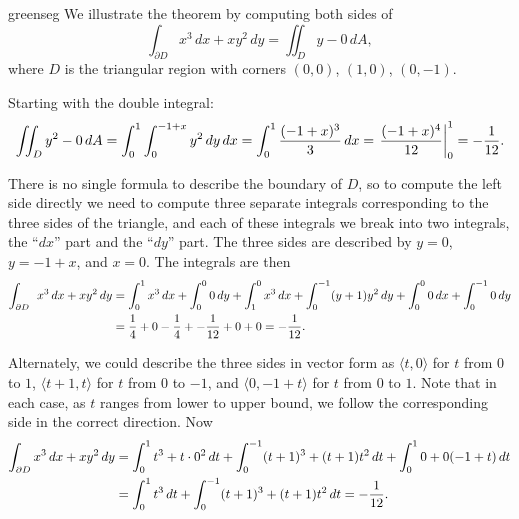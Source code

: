 \begin{example}{}{greenseg}
We illustrate the theorem by computing both sides of
$$\int_{\partial D} x^3\,dx + xy^2\,dy=\iint_D y-0\,dA,$$
where $D$ is the triangular region with corners $(0,0)$, $(1,0)$,
$(0,-1)$.
\end{example}
\begin{solution}
Starting with the double integral:
$$\iint_D y^2-0\,dA=\int_0^1\int_0^{-1+x} y^2\,dy\,dx=
\int_0^1
{(-1+x)^3\over3}\,dx=\left.{(-1+x)^4\over12}\right|_0^1=-{1\over12}.$$

There is no single formula to describe the boundary of $D$, so to
compute the left side directly we need to compute three separate
integrals corresponding to the three sides of the triangle, and each
of these integrals we break into two integrals, the ``$dx$'' part and
the ``$dy$'' part.
The three sides are described by $y=0$, $y=-1+x$, and $x=0$. The
integrals are then
\begin{align*}
\int_{\partial D}\> \> x^3\,dx + xy^2\,dy&=
\int_0^1 x^3\,dx+\int_0^0 0\,dy+\int_1^0 x^3\,dx+\int_0^{-1} (y+1)y^2\,dy+
\int_0^0 0\,dx+\int_0^{-1} 0\,dy	\\
&={1\over4}+0-{1\over4}+-{1\over12}+0+0=-{1\over12}.
\end{align*}

Alternately, we could describe the three sides in vector form as
$\langle t,0\rangle$ for $t$ from $0$ to $1$, $\langle t+1,t\rangle$ for $t$ from $0$ to $-1$, and $\langle 0,-1+t\rangle$ for $t$ from $0$ to $1$. Note that in each case, as $t$ ranges from lower to upper bound, we
follow the corresponding side in the correct direction. Now
\begin{align*}
\int_{\partial D} x^3\,dx + xy^2\,dy&=
\int_0^1 t^3 + t\cdot 0^2\,dt + \int_0^{-1} (t+1)^3 + (t+1)t^2\,dt
+\int_0^1 0 + 0(-1+t)\,dt	\\
&=\int_0^1 t^3\,dt + \int_0^{-1} (t+1)^3 + (t+1)t^2 \,dt
=-{1\over12}.
\end{align*}
%
\end{solution}

